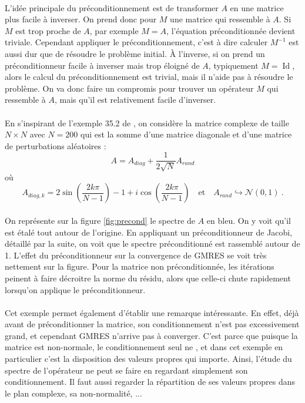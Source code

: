 		\paragraph{}
		L'idée principale du préconditionnement est de transformer $A$ en une matrice plus facile à inverser.
		On prend donc pour $M$ une matrice qui ressemble à $A$.
		Si $M$ est trop proche de $A$, par exemple $M=A$, l'équation préconditionnée devient triviale.
		Cependant appliquer le préconditionnement, c'est à dire calculer $M^{-1}$ est aussi dur que de résoudre le problème initial.
		À l'inverse, si on prend un préconditionneur facile à inverser mais trop éloigné de $A$, typiquement $M = \operatorname{Id}$, alors le calcul du préconditionnement est trivial, mais il n'aide pas à résoudre le problème.
		On va donc faire un compromis pour trouver un opérateur $M$ qui ressemble à $A$, mais qu'il est relativement facile d'inverser.

		\paragraph{}
		En s'inspirant de l'exemple 35.2 de \cite{TrefethenBau1997}, on considère la matrice complexe de taille $N\times N$ avec $N = 200$ qui est la somme d'une matrice diagonale et d'une matrice de perturbations aléatoires :
		\[A = A_{diag} + \frac{1}{2\sqrt{N}}A_{rand}\]
		où
		\[A_{diag, k} = 2\sin\left(\frac{2k\pi}{N-1}\right) - 1 + i\cos\left(\frac{2k\pi}{N-1}\right) \quad\textrm{et}\quad A_{rand}\hookrightarrow\mathcal{N}\left(0,1\right)\ .\]

		\paragraph{}
		On représente sur la figure \ref{fig:precond} le spectre de $A$ en bleu.
		On y voit qu'il est étalé tout autour de l'origine.
		En appliquant un préconditionneur de Jacobi, détaillé par la suite, on voit que le spectre préconditionné est rassemblé autour de 1.
		L'effet du préconditionneur sur la convergence de GMRES se voit très nettement sur la figure.
		Pour la matrice non préconditionnée, les itérations peinent à faire décroitre la norme du résidu, alors que celle-ci chute rapidement lorsqu'on applique le préconditionneur.

		\paragraph{}
		Cet exemple permet également d'établir une remarque intéressante.
		En effet, déjà avant de préconditionner la matrice, son conditionnement n'est pas excessivement grand, et cependant GMRES n'arrive pas à converger.
		C'est parce que puisque la matrice est non-normale, le conditionnement seul ne %
		, et dans cet exemple en particulier c'est la disposition des valeurs propres qui importe.
		Ainsi, l'étude du spectre de l'opérateur ne peut se faire en regardant simplement son conditionnement.
		Il faut aussi regarder la répartition de ses valeurs propres dans le plan complexe, sa non-normalité, ...

